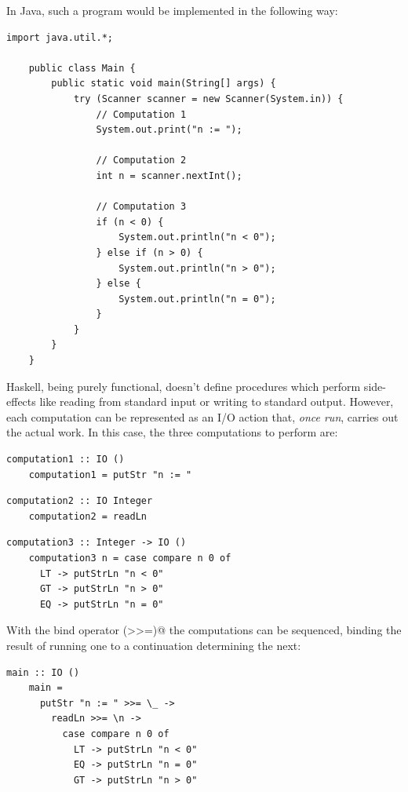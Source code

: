 \documentclass[UdineBachThesis,american,11pt,draft]{PhdThesis}
\begin{document}
  In Java, such a program would be implemented in the following way:

  \begin{lstlisting}[gobble=4,basicstyle=\ttfamily\small]
    import java.util.*;

    public class Main {
        public static void main(String[] args) {
            try (Scanner scanner = new Scanner(System.in)) {
                // Computation 1
                System.out.print("n := ");

                // Computation 2
                int n = scanner.nextInt();

                // Computation 3
                if (n < 0) {
                    System.out.println("n < 0");
                } else if (n > 0) {
                    System.out.println("n > 0");
                } else {
                    System.out.println("n = 0");
                }
            }
        }
    }
  \end{lstlisting}

  Haskell, being purely functional, doesn't define procedures which perform
  side-effects like reading from standard input or writing to standard output.
  However, each computation can be represented as an I/O action that, \emph{once
  run}, carries out the actual work. In this case, the three computations to
  perform are:

  \begin{lstlisting}[gobble=4,basicstyle=\ttfamily\small]
    computation1 :: IO ()
    computation1 = putStr "n := "
  \end{lstlisting}

  \begin{lstlisting}[gobble=4,basicstyle=\ttfamily\small]
    computation2 :: IO Integer
    computation2 = readLn
  \end{lstlisting}

  \begin{lstlisting}[gobble=4,basicstyle=\ttfamily\small]
    computation3 :: Integer -> IO ()
    computation3 n = case compare n 0 of
      LT -> putStrLn "n < 0"
      GT -> putStrLn "n > 0"
      EQ -> putStrLn "n = 0"
  \end{lstlisting}

  With the bind operator \lstinline@(>>=)@ the computations can be sequenced,
  binding the result of running one to a continuation determining the next:

  \begin{lstlisting}[gobble=4,basicstyle=\ttfamily\small]
    main :: IO ()
    main =
      putStr "n := " >>= \_ ->
        readLn >>= \n ->
          case compare n 0 of
            LT -> putStrLn "n < 0"
            EQ -> putStrLn "n = 0"
            GT -> putStrLn "n > 0"
  \end{lstlisting}
\end{document}
